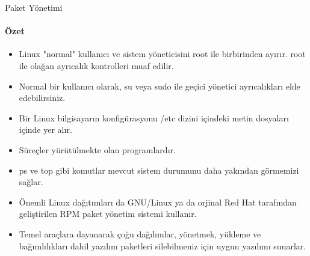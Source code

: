 \begin{section}{Paket Yönetimi}
\paragraph{Özet}{
\begin{itemize}
\item Linux "normal" kullanıcı ve sistem yöneticisini root ile birbirinden ayırır. root ile olağan ayrıcalık kontrolleri muaf edilir.
\item Normal bir kullanıcı olarak, su veya sudo ile geçici yönetici ayrıcalıkları elde edebilirsiniz.
\item Bir Linux bilgisayarın konfigürasyonu /etc dizini içindeki metin dosyaları içinde yer alır.
\item Süreçler yürütülmekte olan programlardır.
\item ps ve top gibi komutlar mevcut sistem durumunu daha yakından görmemizi sağlar.
\item Önemli Linux dağıtımları da GNU/Linux ya da orjinal Red Hat tarafından geliştirilen RPM paket yönetim sistemi kullanır.
\item Temel araçlara dayanarak çoğu dağılımlar, yönetmek, yükleme ve bağımlılıkları dahil yazılım paketleri silebilmeniz için uygun yazılımı sunarlar.
\end{itemize}}
\end{section}